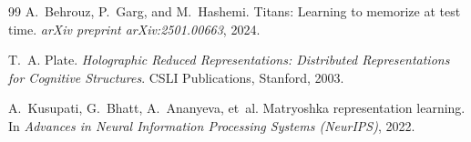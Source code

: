 \documentclass[11pt,a4paper]{article}
\begin{document}
\begin{thebibliography}{99}
A.~Behrouz, P.~Garg, and M.~Hashemi.
\newblock Titans: Learning to memorize at test time.
\newblock \emph{arXiv preprint arXiv:2501.00663}, 2024.

T.~A. Plate.
\newblock \emph{Holographic Reduced Representations: Distributed Representations for Cognitive Structures}.
\newblock CSLI Publications, Stanford, 2003.

A.~Kusupati, G.~Bhatt, A.~Ananyeva, et~al.
\newblock Matryoshka representation learning.
\newblock In \emph{Advances in Neural Information Processing Systems (NeurIPS)}, 2022.

\end{thebibliography}
\end{document}
